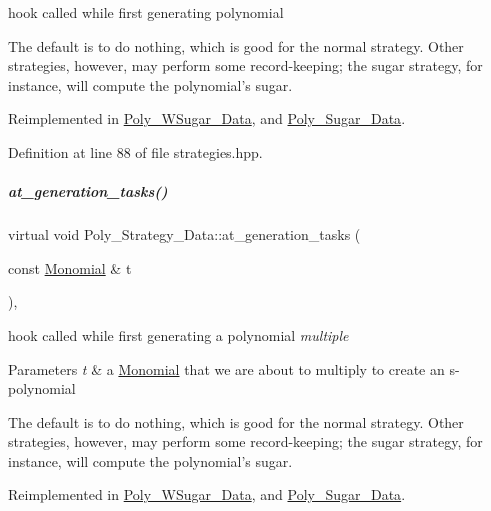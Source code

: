 hook called while first generating polynomial 

The default is to do nothing, which is good for the normal strategy. Other strategies, however, may perform some record-\/keeping; the sugar strategy, for instance, will compute the polynomial's sugar. 

Reimplemented in \hyperlink{group__strategygroup_ac07ee9ee15bd97e5e8befb3f6cec3929}{Poly\+\_\+\+W\+Sugar\+\_\+\+Data}, and \hyperlink{group__strategygroup_a527b105db3edecb8ccfb3f46bbfafe15}{Poly\+\_\+\+Sugar\+\_\+\+Data}.



Definition at line 88 of file strategies.\+hpp.

\mbox{\label{group__strategygroup_a6683749a5fb30b6f91075a28899fbfe7}} 
\subparagraph{\texorpdfstring{at\+\_\+generation\+\_\+tasks()}{at\_generation\_tasks()}\hspace{0.1cm}{\footnotesize\ttfamily [2/2]}}
{\footnotesize\ttfamily virtual void Poly\+\_\+\+Strategy\+\_\+\+Data\+::at\+\_\+generation\+\_\+tasks (\begin{DoxyParamCaption}\item[{const \hyperlink{group__polygroup_class_monomial}{Monomial} \&}]{t }\end{DoxyParamCaption})\hspace{0.3cm}{\ttfamily [inline]}, {\ttfamily [virtual]}}



hook called while first generating a polynomial {\itshape multiple} 


\begin{DoxyParams}{Parameters}
{\em t} & a \hyperlink{group__polygroup_class_monomial}{Monomial} that we are about to multiply to create an s-\/polynomial\\
\hline
\end{DoxyParams}
The default is to do nothing, which is good for the normal strategy. Other strategies, however, may perform some record-\/keeping; the sugar strategy, for instance, will compute the polynomial's sugar. 

Reimplemented in \hyperlink{group__strategygroup_ac58bd8d30e7e10dbbe8e86b1d9d04376}{Poly\+\_\+\+W\+Sugar\+\_\+\+Data}, and \hyperlink{group__strategygroup_a26a462d2dffa89942b82eeecf759bafa}{Poly\+\_\+\+Sugar\+\_\+\+Data}.



